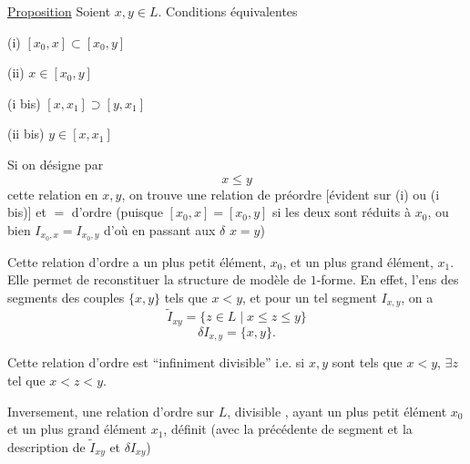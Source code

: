 \uline{Proposition} Soient $x,y\in L$. Conditions équivalentes

(i) $[x_0,x]\subset[x_0,y]$

(ii) \deleted{$\unsure{\exists}$} $x\in[x_0,y]$

(i bis) $[x,x_1]\supset[y,x_1]$

(ii bis)  $y\in[x,x_1]$

Si on  désigne par
\[
x\leq y
\]
cette relation en $x,y$, on trouve une relation de  préordre [évident sur (i) ou (i bis)] et $=$ d'ordre
(puisque $[x_0,x]=[x_0,y]$
si les deux \deleted{$\unsure{\Longrightarrow}$} sont réduits à $x_0$, ou bien $I_{x_0,x}=I_{x_0,y}$ d'où en passant aux $\delta$ $x=y$)



Cette relation d'ordre a un plus petit élément, $x_0$, et un plus grand élément, $x_1$. Elle permet de reconstituer la structure de modèle de $1$-forme. En effet, l'ens des segments    des couples $\{x,y\}$ tels que $x<y$, et pour un tel segment $I_{x,y}$, on a
\[
\tilde I_{xy}=\{z\in L\mid x\leq z\leq y\}
\]
\[
\delta I_{x,y}=\{x,y\}.
\]

Cette relation d'ordre est ``infiniment divisible'' i.e. si $x,y$ sont tels que $x<y$, $\exists z$ tel que $x<z<y$.



Inversement, une relation d'ordre sur $L$, divisible , ayant un plus petit élément  $x_0$ et un plus grand élément $x_1$, définit (avec la  précédente de segment  et  la description de $\tilde I_{xy}$ et $\delta I_{xy}$)

